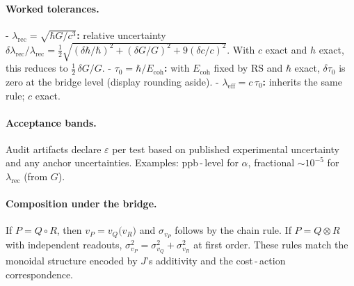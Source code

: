\documentclass[11pt]{article}
\newcommand{\lamrec}{\lambda_{\mathrm{rec}}}
\newcommand{\tauzero}{\tau_{0}}
\newcommand{\Ecoh}{E_{\mathrm{coh}}}
\theoremstyle{remark}
\begin{document}
\paragraph{Worked tolerances.}
- \textbf{$\lamrec = \sqrt{\hbar G/ c^3}$:} relative uncertainty
\(\delta \lamrec / \lamrec = \tfrac{1}{2}\sqrt{(\delta\hbar/\hbar)^2 + (\delta G/G)^2 + 9(\delta c/c)^2}\). With $c$ exact and $h$ exact, this reduces to $\tfrac{1}{2}\,\delta G/G$.
- \textbf{$\tauzero = \hbar/\Ecoh$:} with $\Ecoh$ fixed by RS and $\hbar$ exact, $\delta \tauzero$ is zero at the bridge level (display rounding aside).
- \textbf{$\lambda_{\mathrm{eff}} = c\,\tauzero$:} inherits the same rule; $c$ exact.

\paragraph{Acceptance bands.}
Audit artifacts declare $\varepsilon$ per test based on published experimental uncertainty and any anchor uncertainties.
Examples: ppb\,\mbox{-}\,level for $\alpha$, fractional $\sim 10^{-5}$ for $\lamrec$ (from $G$).

\paragraph{Composition under the bridge.}
If $P=Q\circ R$, then $v_P = v_Q\bigl(v_R\bigr)$ and $\sigma_{v_P}$ follows by the chain rule. If $P=Q\otimes R$ with
independent readouts, $\sigma_{v_P}^2 = \sigma_{v_Q}^2 + \sigma_{v_R}^2$ at first order. These rules match the monoidal
structure encoded by $J$'s additivity and the cost\,\mbox{-}\,action correspondence.
\end{document}
